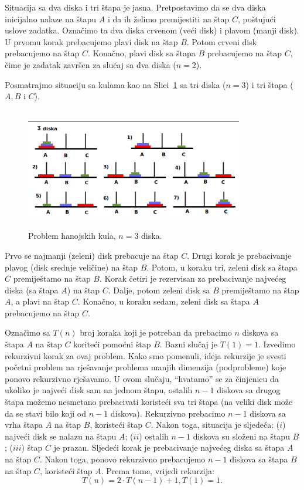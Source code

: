 \begin{solution}
 
 
 	Situacija sa dva diska i tri štapa je jasna. Pretpostavimo da se dva diska inicijalno nalaze na štapu $A$ i da ih želimo premijestiti na štap $C$, poštujući uslove zadatka. Označimo ta dva diska crvenom (veći disk) i plavom (manji disk). U prvomu korak prebacujemo plavi disk na štap $B$. Potom crveni disk prebacujemo na štap $C$. Konačno, plavi disk sa štapa $B$ prebacujemo na štap $C$, čime je zadatak završen za slučaj sa dva diska ($n=2$).
 	
 	Posmatrajmo situaciju sa kulama kao na Slici~\ref{fig:tower} sa tri diska ($n=3$) i tri štapa ($A, B$ i $C$). 
 	
 	\begin{figure}[H]
 		\centering
 		\includegraphics[width=270pt,height=150pt]{slike/tower.png}


 	 \caption{Problem hanojskih kula, $n=3$ diska.}     \label{fig:tower}
 	 	\end{figure}


 Prvo se najmanji (zeleni) disk prebacuje na štap $C$. Drugi korak je prebacivanje plavog (disk srednje veličine) na štap $B$. Potom, u koraku tri, zeleni disk sa štapa $C$ premiještamo na štap $B$. Korak četiri je rezervisan za prebacivanje najvećeg diska (sa štapa $A$)  na štap $C$. Dalje, potom zeleni disk sa $B$ premiještamo na štap $A$, a plavi na štap $C$. Konačno, u koraku sedam, zeleni disk sa štapa $A$ prebacujemo na štap $C$.  
 
Označimo sa $T(n)$ broj koraka koji je potreban da prebacimo $n$ diskova sa štapa $A$ na štap $C$ koriteći pomoćni štap $B$. Bazni slučaj je $T(1) = 1$. Izvedimo rekurzivni korak za ovaj problem. Kako smo pomenuli, ideja rekurzije je svesti početni problem na rješavanje problema manjih dimenzija (podprobleme) koje ponovo   rekurzivno rješavamo. U ovom slučaju, ``hvatamo'' se za činjenicu da ukoliko je najveći disk sam na jednom štapu, ostalih $n-1$ diskova sa drugog štapa možemo nesmetano prebacivati koristeći sva tri štapa (na veliki disk može da se stavi bilo koji od $n-1$ diskova). Rekurzivno prebacimo $n-1$ diskova sa vrha štapa $A$ na štap $B$, koristeći štap $C$. Nakon toga, situacija je  sljedeća: ($i$) najveći disk se nalazu na štapu $A$; ($ii$) ostalih $n-1$ diskova su složeni na štapu $B$; ($iii$) štap $C$ je prazan. Sljedeći korak je prebacivanje najvećeg diska sa štapa $A$ na štap $C$. Nakon toga, ponovo rekurzivno prebacujemo $n-1$ diskova sa štapa $B$ na štap $C$, koristeći štap $A$. Prema tome, vrijedi rekurzija:
$$ T(n) = 2 \cdot T(n-1) + 1, T(1) = 1.$$
 

\end{solution}
